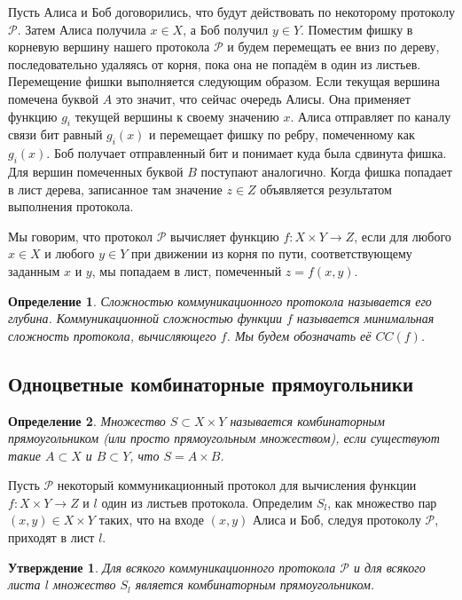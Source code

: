\documentclass[a4paper]{article}
\newtheorem*{mclaim}{Утверждение}
\newtheorem*{mdefinition}{Определение}
\begin{document}
Пусть Алиса и Боб договорились, что будут действовать по некоторому протоколу $\mathcal{P}$. Затем
Алиса получила $x\in X$, а Боб получил $y\in Y$. Поместим фишку в корневую вершину нашего протокола
$\mathcal{P}$ и будем перемещать ее вниз по дереву, последовательно удаляясь от корня,
пока она не попадём в один из листьев. Перемещение фишки выполняется следующим образом. Если текущая 
вершина помечена буквой $A$ это значит, что сейчас очередь Алисы. Она применяет функцию $g_i$ текущей 
вершины к своему значению $x$. Алиса отправляет по каналу связи бит равный $g_i(x)$ и перемещает
фишку по ребру, помеченному как $g_i(x)$. Боб получает отправленный бит и понимает куда была сдвинута фишка.
Для вершин помеченных буквой $B$ поступают аналогично. Когда фишка попадает в лист дерева,
записанное там значение $z\in Z$ объявляется результатом выполнения протокола.

Мы говорим, что протокол $\mathcal{P}$ вычисляет функцию $f:X\times Y \rightarrow Z$, если для любого
$x\in X$ и любого $y\in Y$ при движении из корня по пути, соответствующему заданным $x$ и $y$,
мы попадаем в лист, помеченный $z=f(x,y)$.

\begin{mdefinition}
    Сложностью коммуникационного протокола называется его глубина. Коммуникационной сложностью функции
$f$ называется минимальная сложность протокола, вычисляющего $f$. Мы будем обозначать её $CC(f)$.
\end{mdefinition}


\subsection{Одноцветные комбинаторные прямоугольники}
\begin{mdefinition}
    Множество $S \subset X\times Y$ называется комбинаторным прямоугольником (или просто прямоугольным
    множеством), если существуют такие $A \subset X$ и $B \subset Y$, что $S = A\times B$.
\end{mdefinition}

Пусть $\mathcal{P}$ некоторый коммуникационный протокол для вычисления функции $f:X\times Y \rightarrow Z$ 
и $l$ один из листьев протокола. Определим $S_l$, как множество пар $(x, y) \in X\times Y$ таких, что 
на входе $(x,y)$ Алиса и Боб, следуя протоколу $\mathcal{P}$, приходят в лист $l$.

\begin{mclaim}
    Для всякого коммуникационного протокола $\mathcal{P}$ и для всякого листа $l$ множество $S_l$
    является комбинаторным прямоугольником. 
\end{mclaim}
\end{document}
